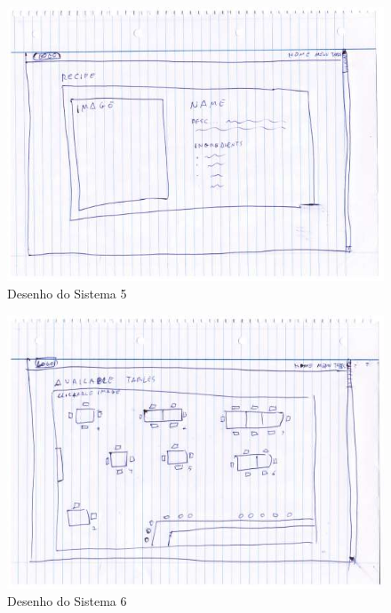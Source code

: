 \begin{figure}[!hbt]
    \centering
    \includegraphics[width=14cm]{Resources/Previous/image-094.jpg}
    \caption{Desenho do Sistema 5}
    
\end{figure}
\FloatBarrier
\begin{figure}[!hbt]
    \centering
    \includegraphics[width=14cm]{Resources/Previous/image-095.jpg}
    \caption{Desenho do Sistema 6}
    
\end{figure}
\FloatBarrier
